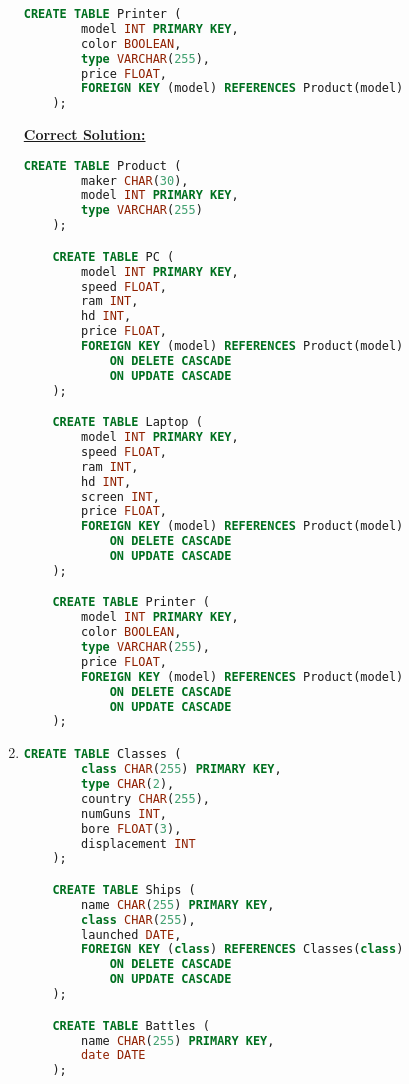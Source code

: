 \documentclass[12pt]{article}
\begin{document}
\begin{enumerate}[1.]
\begin{lstlisting}[language=SQL]
    CREATE TABLE Printer (
        model INT PRIMARY KEY,
        color BOOLEAN,
        type VARCHAR(255),
        price FLOAT,
        FOREIGN KEY (model) REFERENCES Product(model)
    );

    \end{lstlisting}

    \bigskip

    \begin{mdframed}
        \underline{\textbf{Correct Solution:}}

        \bigskip

    \begin{lstlisting}[language=SQL]
    CREATE TABLE Product (
        maker CHAR(30),
        model INT PRIMARY KEY,
        type VARCHAR(255)
    );

    CREATE TABLE PC (
        model INT PRIMARY KEY,
        speed FLOAT,
        ram INT,
        hd INT,
        price FLOAT,
        FOREIGN KEY (model) REFERENCES Product(model)
            ON DELETE CASCADE
            ON UPDATE CASCADE
    );

    CREATE TABLE Laptop (
        model INT PRIMARY KEY,
        speed FLOAT,
        ram INT,
        hd INT,
        screen INT,
        price FLOAT,
        FOREIGN KEY (model) REFERENCES Product(model)
            ON DELETE CASCADE
            ON UPDATE CASCADE
    );

    CREATE TABLE Printer (
        model INT PRIMARY KEY,
        color BOOLEAN,
        type VARCHAR(255),
        price FLOAT,
        FOREIGN KEY (model) REFERENCES Product(model)
            ON DELETE CASCADE
            ON UPDATE CASCADE
    );

    \end{lstlisting}


    \end{mdframed}

    \item

    \begin{lstlisting}[language=SQL]
    CREATE TABLE Classes (
        class CHAR(255) PRIMARY KEY,
        type CHAR(2),
        country CHAR(255),
        numGuns INT,
        bore FLOAT(3),
        displacement INT
    );

    CREATE TABLE Ships (
        name CHAR(255) PRIMARY KEY,
        class CHAR(255),
        launched DATE,
        FOREIGN KEY (class) REFERENCES Classes(class)
            ON DELETE CASCADE
            ON UPDATE CASCADE
    );

    CREATE TABLE Battles (
        name CHAR(255) PRIMARY KEY,
        date DATE
    );


\end{lstlisting}
\end{enumerate}
\end{document}
